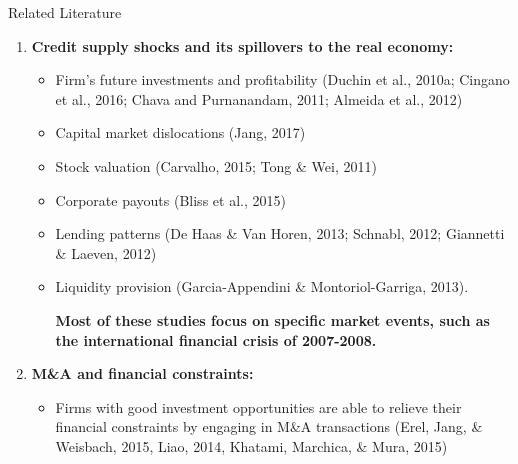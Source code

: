 \documentclass[10pt]{beamer}
\begin{document}
\begin{frame}{Related Literature}

\begin{enumerate}
\item \textbf{Credit supply shocks and its spillovers to the real economy:}
\begin{itemize}
    \item Firm's future investments and profitability (Duchin et al., 2010a; Cingano et al., 2016; Chava and Purnanandam, 2011; Almeida et al., 2012)
    \item Capital market dislocations (Jang, 2017)
    \item Stock valuation (Carvalho, 2015; Tong \& Wei, 2011)
    \item Corporate payouts (Bliss et al., 2015)
    \item Lending patterns (De Haas \& Van Horen, 2013; Schnabl, 2012; Giannetti \& Laeven, 2012)
    \item Liquidity provision (Garcia-Appendini \& Montoriol-Garriga, 2013).
\par
\textbf{Most of these studies focus on specific market events, such as the international financial crisis of 2007-2008.}
\end{itemize}
 
\item \textbf{M\&A and financial constraints:}
\begin{itemize}
\item Firms with good investment opportunities are able to relieve their financial constraints by engaging in M\&A transactions (Erel, Jang, \& Weisbach, 2015, Liao, 2014, Khatami, Marchica, \& Mura, 2015)
\end{itemize}

\end{enumerate}
\end{frame}
\end{document}
